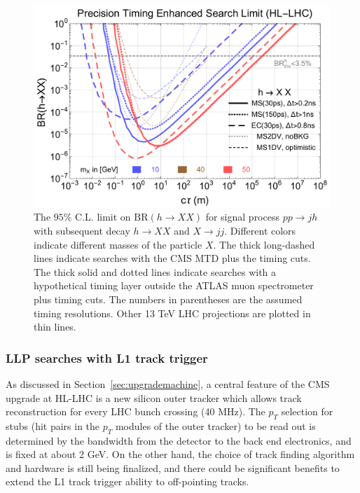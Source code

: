 \begin{figure}[t]
    \centering
    \includegraphics[width=1.0\columnwidth]{figures/MTD/10-20-50-MC-Lcalc-BRlimit-with-deltaT-cut-MS-1ns.pdf} 
    \caption{The $95\%$ C.L. limit on $\text{BR}(h \to XX)$ for signal process $pp \to j h$ with subsequent decay 
    $h\to X X$ and $X \to j j$. Different colors indicate different masses of the particle $X$. 
    The thick long-dashed lines indicate searches with the CMS MTD plus the timing cuts. 
    The thick solid and dotted lines indicate searches with a hypothetical timing layer outside the ATLAS muon spectrometer plus timing cuts.
    The numbers in parentheses are 
    the assumed timing resolutions. Other 13 TeV LHC projections \cite{Coccaro:2016lnz, Bernaciak:2014pna} are plotted in thin lines.
    }
    \label{fig:ctaulimitHiggs}
\end{figure}


\subsubsection{LLP searches with L1 track trigger}

As discussed in Section~\ref{sec:upgrademachine}, a central feature of the CMS upgrade at HL-LHC is a new silicon outer tracker which allows track reconstruction for every LHC bunch crossing (40 MHz). 
The $p_T$ selection for stubs (hit pairs in the $p_T$ modules of the outer tracker) to be read out is determined by the bandwidth from the detector 
to the back end electronics, and is fixed at about 2 GeV. 
On the other hand, the choice of track finding algorithm and hardware is still being finalized, and there could be significant benefits to extend the L1 track trigger ability to off-pointing tracks. 

